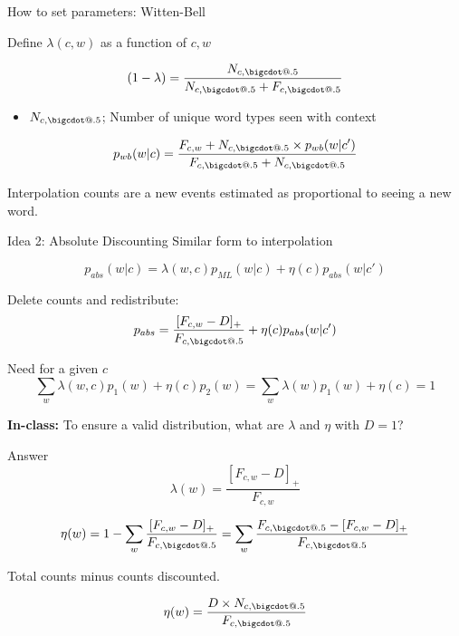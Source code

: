 \documentclass{beamer}
\makeatletter
\newcommand*\bigcdot{\mathpalette\bigcdot@{.5}}
\newcommand*\bigcdot@[2]{\mathbin{\vcenter{\hbox{\scalebox{#2}{$\m@th#1\bullet$}}}}}
\makeatother
\begin{document}
\begin{frame}{How to set parameters:  Witten-Bell}

  Define $\lambda(c, w)$ as a function of $c, w$

  \[(1 - \lambda) =  \frac{\displaystyle N_{c, \bigcdot}} {\displaystyle N_{c, \bigcdot} + F_{c, \bigcdot}}\]

  \begin{itemize}
  \item $N_{c, \bigcdot}$; Number of unique word types seen with context 
  \end{itemize}

  \[ p_{wb}(w | c) = \frac{\displaystyle F_{c, w} + N_{c, \bigcdot} \times p_{wb}(w| c')} {\displaystyle  F_{c, \bigcdot} + N_{c, \bigcdot}} \]

    Interpolation counts are a new events estimated as proportional to seeing a new word.
\end{frame}

\begin{frame}{Idea 2: Absolute Discounting}
  Similar form to interpolation

  \[ p_{abs}(w |  c) =  \lambda(w,c) p_{ML}(w |  c) + \eta(c) p_{abs}(w | c') \]

  Delete counts and redistribute:
    \[ p_{abs} =\frac{[F_{c,w} - D]_{+}}{F_{c, \bigcdot}} +  \eta(c) p_{abs}(w |  c' )  \]

  Need for a given $c$
  \[\sum_{w} \lambda(w, c)p_1(w) + \eta(c)p_2(w) = \sum_{w} \lambda(w)p_1(w) + \eta(c) = 1\]


  \textbf{In-class:} To ensure a valid distribution, what are $\lambda$  and $\eta$ with $D=1$?
  
\end{frame}

\begin{frame}{Answer}
  \[\lambda(w) = \frac{[F_{c,w} - D]_{+}}{F_{c,w}} \]

  \[\eta(w) = 1 - \sum_w \frac{[F_{c,w} - D]_{+}}{F_{c, \bigcdot}} = \sum_w \frac{F_{c, \bigcdot} - [F_{c,w} - D]_{+}}{F_{c, \bigcdot}} \]

  Total counts minus counts discounted. 

  \[ \eta(w)= \frac{D \times N_{c, \bigcdot}}{F_{c, \bigcdot}} \] 
\end{frame}
\end{document}
